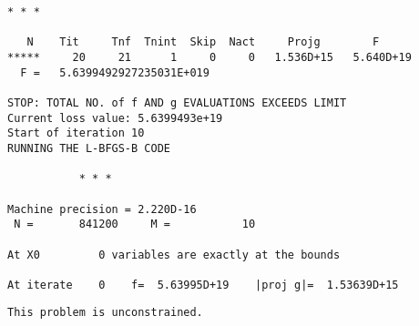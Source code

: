\documentclass[11pt]{article}
\begin{document}
\begin{Verbatim}[commandchars=\\\{\}]
           * * *

   N    Tit     Tnf  Tnint  Skip  Nact     Projg        F
*****     20     21      1     0     0   1.536D+15   5.640D+19
  F =   5.6399492927235031E+019

STOP: TOTAL NO. of f AND g EVALUATIONS EXCEEDS LIMIT
Current loss value: 5.6399493e+19
Start of iteration 10
RUNNING THE L-BFGS-B CODE

           * * *

Machine precision = 2.220D-16
 N =       841200     M =           10

At X0         0 variables are exactly at the bounds

At iterate    0    f=  5.63995D+19    |proj g|=  1.53639D+15
    \end{Verbatim}

    \begin{Verbatim}[commandchars=\\\{\}]
 This problem is unconstrained.
    \end{Verbatim}
\end{document}
